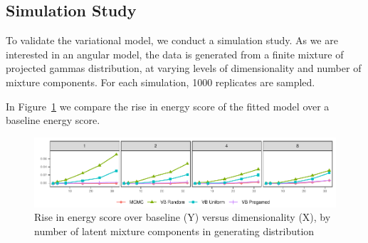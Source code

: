\subsection{Simulation Study}
To validate the variational model, we conduct a simulation study.
    As we are interested in an angular model, the data is generated from 
    a finite mixture of projected gammas distribution, at varying levels
    of dimensionality and number of mixture components.  For each simulation,
    1000 replicates are sampled.



In Figure~\ref{fig:energyscore} we compare the rise in energy score of the fitted
    model over a baseline energy score.


\begin{figure}[ht]
    \caption{Rise in energy score over baseline (Y) versus dimensionality (X), 
            by number of latent mixture components in generating distribution
            \label{fig:energyscore}}
    \includegraphics{./plots/energy_score}
\end{figure}


